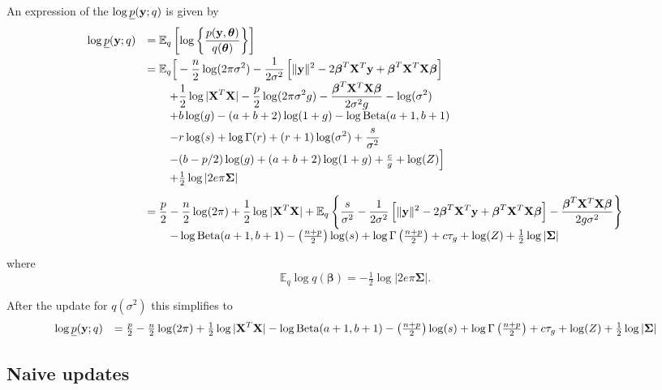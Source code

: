 \documentclass{article}
\def\vectorfontone{\bf}
\def\vectorfonttwo{\boldsymbol}
\def\vy{{\vectorfontone y}}                      %
\def\vbeta{{\vectorfonttwo \beta}}               %
\def\vtheta{{\vectorfonttwo \theta}}             %
\def\matrixfontone{\bf}
\def\matrixfonttwo{\boldsymbol}
\def\mX{{\matrixfontone X}}                      %
\def\mSigma{{\matrixfonttwo \Sigma}}             %
\def\bE{{\mathbb E}}                             %
\def\ds{\displaystyle}
\begin{document}
An expression of the $\log \underline{p}(\vy;q)$
is given by
$$
\begin{array}{rl}
\log \underline{p}(\vy;q)
& \ds = \bE_q\left[ \log\left\{
\frac{p(\vy,\vtheta)}{q(\vtheta)}
\right\} 
\right]
\\ [2ex]
& \ds = \bE_q\Big[ - \frac{n}{2}\log(2\pi\sigma^2) - \frac{1}{2\sigma^2}\left[
\|\vy\|^2  - 2\vbeta^T\mX^T\vy + \vbeta^T\mX^T\mX\vbeta \right] 
\\ [1ex]
& \ds  \qquad  + \frac{1}{2}\log|\mX^T\mX| - \frac{p}{2}\log(2\pi\sigma^2 g) - \frac{\vbeta^T\mX^T\mX\vbeta}{2\sigma^2 g} - \log(\sigma^2)
\\ [1ex]
& \ds  \qquad  + b\log(g) - (a+b+2)\log(1 + g) - \log\mbox{Beta}(a+1,b+1)  
\\ [1ex]
& \ds  \qquad 
- r\log(s) + \log\Gamma(r) + \left( r + 1\right)\log(\sigma^2) + \frac{s}{\sigma^2}
\\ [1ex]
& \ds  \qquad - (b - p/2)\log(g) + (a+b+2)\log(1 + g) + \tfrac{c}{g} + \log(Z) \Big]
\\ [1ex]
& \ds  \qquad  + \tfrac{1}{2}\log|2e\pi\mSigma|


\\ [2ex]
& \ds =  
\frac{p}{2} 
- \frac{n}{2}\log(2\pi)
+ \frac{1}{2}\log|\mX^T\mX| 
+  \bE_q\left\{ \frac{s}{\sigma^2} - \frac{1}{2\sigma^2}\left[
\|\vy\|^2  - 2\vbeta^T\mX^T\vy + \vbeta^T\mX^T\mX\vbeta \right] 
 - \frac{\vbeta^T\mX^T\mX\vbeta}{2 g\sigma^2}  \right\} 
\\ [1ex]
& \ds  \qquad  - \log\mbox{Beta}(a+1,b+1)  - \left(\tfrac{n+p}{2} \right)\log(s) + \log\Gamma\left(\tfrac{n+p}{2} \right)
+ c\tau_g + \log(Z)  + \tfrac{1}{2}\log|\mSigma| 
\end{array}
$$ 

\noindent where
$$
\bE_q \log q(\vbeta) = -\tfrac{1}{2}\log|2e\pi\mSigma|.
$$


\noindent After the update for $q(\sigma^2)$ this simplifies to
$$
\begin{array}{rl}
\log \underline{p}(\vy;q)
& \ds =  
\tfrac{p}{2} 
- \tfrac{n}{2}\log(2\pi)
+ \tfrac{1}{2}\log|\mX^T\mX| 
- \log\mbox{Beta}(a+1,b+1)  
- \left(\tfrac{n+p}{2} \right)\log(s) 
+ \log\Gamma\left(\tfrac{n+p}{2} \right)
+ c\tau_g + \log(Z)  + \tfrac{1}{2}\log|\mSigma| 
\end{array}
$$ 
 


\subsection{Naive updates}\label{sec:Naive}
\end{document}
